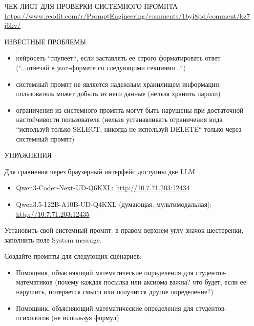 \documentclass[aspectratio=169]{beamer}
\begin{document}
{\begin{frame}{ЧЕК-ЛИСТ ДЛЯ ПРОВЕРКИ СИСТЕМНОГО ПРОМПТА}
            \url{https://www.reddit.com/r/PromptEngineering/comments/1byj8pd/comment/kz7j6kv/}
        \end{frame}       
        
        
        
        
        \begin{frame}{ИЗВЕСТНЫЕ ПРОБЛЕМЫ}
                        
            \begin{itemize}
                \item [-] нейросеть ``глупеет``, если заставлять ее строго форматировать ответ (``...отвечай в json-формате со следующими секциями...``)
                \item [-] системный промпт не является надежным хранилищем информации: пользователь может добыть из него данные (нельзя хранить пароли)
                \item [-] ограничения из системного промпта могут быть нарушены при достаточной настойчивости пользователя (нельзя устанавливать ограничения вида ``используй только SELECT, никогда не используй DELETE`` только через системный промпт)                
            \end{itemize}
            
            
        \end{frame}  
        
        
       \begin{frame}{УПРАЖНЕНИЯ}
      	
      	Для сравнения через браузерный интерфейс доступны две LLM
      	
      	\begin{itemize}
      		\item [-] Qwen3-Coder-Next-UD-Q6\textunderscore K\textunderscore XL: \url{http://10.7.71.203:12434} 
      		\item [-] Qwen3.5-122B-A10B-UD-Q4\textunderscore K\textunderscore XL (думающая, мультимодальная): \url{http://10.7.71.203:12435} 
      	\end{itemize}
      	
      	Установить свой системный промпт: в правом верхнем углу значок шестеренки, заполнить поле System message.
      	
      	\bigskip
      	
      	Создайте промпты для следующих сценариев:
      	\begin{itemize}
      		\item [-] Помощник, объясняющий математические определения для студентов-математиков (почему каждая посылка или аксиома важна? что будет, если ее нарушить, потеряется смысл или получится другое определение?)
      		\item [-] Помощник, объясняющий математические определения для студентов-психологов (не используя формул)
      	\end{itemize}
      	
      \end{frame}    
        
        
    } %
     
\end{document}
